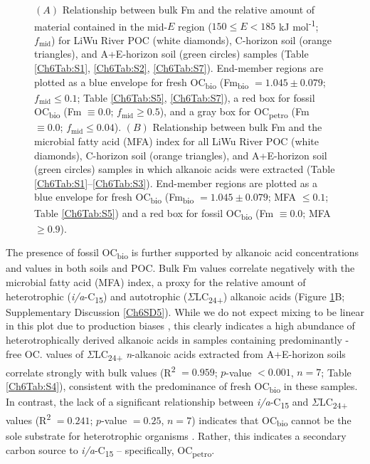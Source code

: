 \begin{figure}[p]
	\caption[$f_{\text{mid}}$ and MFA index vs. Fm mixing plots]{$(A)$ Relationship between bulk Fm and the relative amount of material contained in the mid-$E$ region ($150 \leq E < 185$ kJ mol\textsuperscript{-1}; $f_{\text{mid}}$) for LiWu River POC (white diamonds), C-horizon soil (orange triangles), and A+E-horizon soil (green circles) samples (Table \ref{Ch6Tab:S1}, \ref{Ch6Tab:S2}, \ref{Ch6Tab:S7}). End-member regions are plotted as a blue envelope for fresh OC\textsubscript{bio} (Fm\textsubscript{bio} $= 1.045 \pm 0.079$; $f_{\text{mid}} \leq 0.1$; Table \ref{Ch6Tab:S5}, \ref{Ch6Tab:S7}), a red box for fossil OC\textsubscript{bio} (Fm $\equiv 0.0$; $f_{\text{mid}} \geq 0.5$), and a gray box for OC\textsubscript{petro} (Fm $\equiv 0.0$; $f_{\text{mid}} \leq 0.04$). $(B)$ Relationship between bulk Fm and the microbial fatty acid (MFA) index for all LiWu River POC (white diamonds), C-horizon soil (orange triangles), and A+E-horizon soil (green circles) samples in which alkanoic acids were extracted (Table \ref{Ch6Tab:S1}--\ref{Ch6Tab:S3}). End-member regions are plotted as a blue envelope for fresh OC\textsubscript{bio} (Fm\textsubscript{bio} $= 1.045 \pm 0.079$; MFA $\leq 0.1$; Table \ref{Ch6Tab:S5}) and a red box for fossil OC\textsubscript{bio} (Fm $\equiv 0.0$; MFA $\geq 0.9$).}
	\label{Ch6Fig:3} 
\end{figure}

The presence of fossil OC\textsubscript{bio} is further supported by alkanoic acid concentrations and  values in both soils and POC. Bulk Fm values correlate negatively with the microbial fatty acid (MFA) index, a proxy for the relative amount of heterotrophic (\textit{i/a}-C\textsubscript{15}) and autotrophic ($\Sigma$LC\textsubscript{24+}) alkanoic acids (Figure \ref{Ch6Fig:3}B; Supplementary Discussion \ref{Ch6SD5}). While we do not expect mixing to be linear in this plot due to production biases \citep{Hemingway:2016bq}, this clearly indicates a high abundance of heterotrophically derived alkanoic acids in samples containing predominantly -free OC.  values of $\Sigma$LC\textsubscript{24+} \textit{n}-alkanoic acids extracted from A+E-horizon soils correlate strongly with bulk  values (R\textsuperscript{2} $= 0.959$; $p$-value $< 0.001$, $n = 7$; Table \ref{Ch6Tab:S4}), consistent with the predominance of fresh OC\textsubscript{bio} in these samples. In contrast, the lack of a significant relationship between \textit{i/a}-C\textsubscript{15} and $\Sigma$LC\textsubscript{24+}  values (R\textsuperscript{2} $= 0.241$; $p$-value $= 0.25$, $n = 7$) indicates that OC\textsubscript{bio} cannot be the sole substrate for heterotrophic organisms \citep{Blair:1985ti}. Rather, this indicates a secondary carbon source to \textit{i/a}-C\textsubscript{15} -- specifically, OC\textsubscript{petro}.

